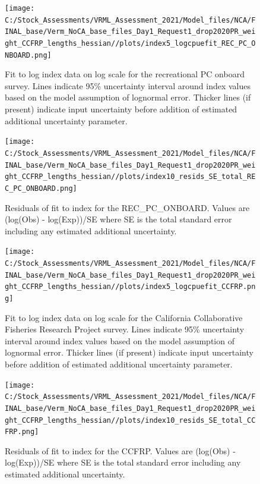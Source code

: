 \documentclass[
  english,
  a4paper,
]{article}
\begin{document}
\begin{figure}
\centering
\texttt{[image: C:/Stock\_Assessments/VRML\_Assessment\_2021/Model\_files/NCA/FINAL\_base/Verm\_NoCA\_base\_files\_Day1\_Request1\_drop2020PR\_weight\_CCFRP\_lengths\_hessian//plots/index5\_logcpuefit\_REC\_PC\_ONBOARD.png]}
\caption{Fit to log index data on log scale for the recreational PC onboard survey. Lines indicate 95\% uncertainty interval around index values based on the model assumption of lognormal error. Thicker lines (if present) indicate input uncertainty before addition of estimated additional uncertainty parameter.\label{fig:log-cpue-REC-PC-ONBOARD}}
\end{figure}

\begin{figure}
\centering
\texttt{[image: C:/Stock\_Assessments/VRML\_Assessment\_2021/Model\_files/NCA/FINAL\_base/Verm\_NoCA\_base\_files\_Day1\_Request1\_drop2020PR\_weight\_CCFRP\_lengths\_hessian//plots/index10\_resids\_SE\_total\_REC\_PC\_ONBOARD.png]}
\caption{Residuals of fit to index for the REC\_PC\_ONBOARD. Values are (log(Obs) - log(Exp))/SE where SE is the total standard error including any estimated additional uncertainty.\label{fig:cpue-resid-REC-PC-ONBOARD}}
\end{figure}

\begin{figure}
\centering
\texttt{[image: C:/Stock\_Assessments/VRML\_Assessment\_2021/Model\_files/NCA/FINAL\_base/Verm\_NoCA\_base\_files\_Day1\_Request1\_drop2020PR\_weight\_CCFRP\_lengths\_hessian//plots/index5\_logcpuefit\_CCFRP.png]}
\caption{Fit to log index data on log scale for the California Collaborative Fisheries Research Project survey. Lines indicate 95\% uncertainty interval around index values based on the model assumption of lognormal error. Thicker lines (if present) indicate input uncertainty before addition of estimated additional uncertainty parameter.\label{fig:log-cpue-CCFRP}}
\end{figure}

\begin{figure}
\centering
\texttt{[image: C:/Stock\_Assessments/VRML\_Assessment\_2021/Model\_files/NCA/FINAL\_base/Verm\_NoCA\_base\_files\_Day1\_Request1\_drop2020PR\_weight\_CCFRP\_lengths\_hessian//plots/index10\_resids\_SE\_total\_CCFRP.png]}
\caption{Residuals of fit to index for the CCFRP. Values are (log(Obs) - log(Exp))/SE where SE is the total standard error including any estimated additional uncertainty.\label{fig:cpue-resid-CCFRP}}
\end{figure}
\end{document}
